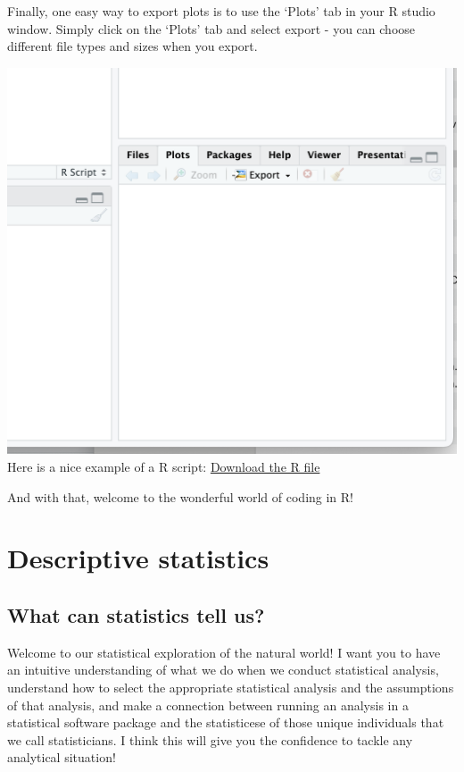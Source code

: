 \documentclass[
]{book}
\begin{document}
Finally, one easy way to export plots is to use the `Plots' tab in your R studio window. Simply click on the `Plots' tab and select export - you can choose different file types and sizes when you export.

\includegraphics{images/01-intro/fileexport.png}
Here is a nice example of a R script: \href{downloads/intro.R}{Download the R file}

And with that, welcome to the wonderful world of coding in R!

\hypertarget{descriptive-statistics}{%
\chapter{Descriptive statistics}\label{descriptive-statistics}}

\hypertarget{what-can-statistics-tell-us}{%
\section{What can statistics tell us?}\label{what-can-statistics-tell-us}}

Welcome to our statistical exploration of the natural world! I want you to have an intuitive understanding of what we do when we conduct statistical analysis, understand how to select the appropriate statistical analysis and the assumptions of that analysis, and make a connection between running an analysis in a statistical software package and the statisticese of those unique individuals that we call statisticians. I think this will give you the confidence to tackle any analytical situation!
\end{document}
